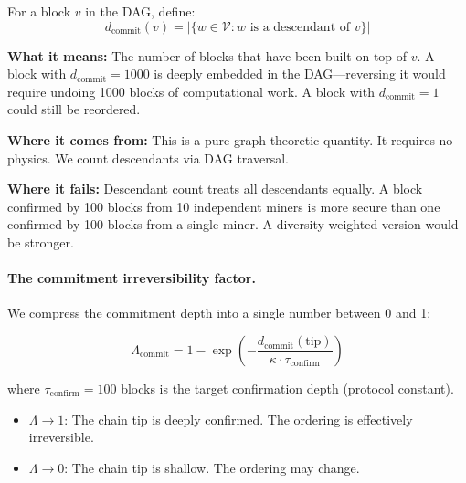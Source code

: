 \documentclass[11pt,a4paper]{article}
\begin{document}
\begin{susskindbox}
For a block $v$ in the DAG, define:
\begin{equation}
d_{\text{commit}}(v) = \bigl|\{w \in \mathcal{V} : w \text{ is a descendant of } v\}\bigr|
\label{eq:dcommit}
\end{equation}

\textbf{What it means:} The number of blocks that have been built on top of $v$. A block with $d_{\text{commit}} = 1000$ is deeply embedded in the DAG---reversing it would require undoing 1000 blocks of computational work. A block with $d_{\text{commit}} = 1$ could still be reordered.

\textbf{Where it comes from:} This is a pure graph-theoretic quantity. It requires no physics. We count descendants via DAG traversal.

\textbf{Where it fails:} Descendant count treats all descendants equally. A block confirmed by 100 blocks from 10 independent miners is more secure than one confirmed by 100 blocks from a single miner. A diversity-weighted version would be stronger.
\end{susskindbox}

\paragraph{The commitment irreversibility factor.} We compress the commitment depth into a single number between 0 and 1:

\begin{equation}
\Lambda_{\text{commit}} = 1 - \exp\!\left(-\frac{d_{\text{commit}}(\text{tip})}{\kappa \cdot \tau_{\text{confirm}}}\right)
\label{eq:lambda}
\end{equation}

where $\tau_{\text{confirm}} = 100$ blocks is the target confirmation depth (protocol constant).

\begin{itemize}[nosep]
    \item $\Lambda \to 1$: The chain tip is deeply confirmed. The ordering is effectively irreversible.
    \item $\Lambda \to 0$: The chain tip is shallow. The ordering may change.
\end{itemize}
\end{document}
